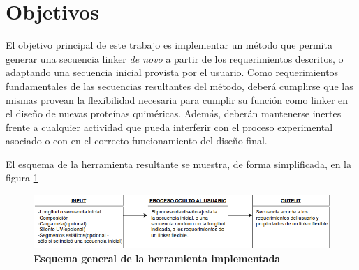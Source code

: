        
       
       
       
       
       
       
\section{Objetivos}

El objetivo principal de este trabajo es implementar un método que permita generar una secuencia linker \textit{de novo} a partir de los requerimientos descritos, o adaptando una secuencia inicial provista por el usuario. %
Como requerimientos fundamentales de las secuencias resultantes del método, deberá cumplirse que las mismas provean la flexibilidad necesaria para cumplir su función como linker en el diseño de nuevas proteínas quiméricas.
Además, deberán mantenerse inertes frente a cualquier actividad que pueda interferir con el proceso experimental asociado o con en el correcto funcionamiento del diseño final.


El esquema de la herramienta resultante se muestra, de forma simplificada, en la figura \ref{diagram}

\begin{figure}[h!]
\centering
   \includegraphics[width=\textwidth]{img/diagram.png}
 \caption{\textbf{Esquema general de la herramienta implementada}}
 \label{diagram}
\end{figure}

